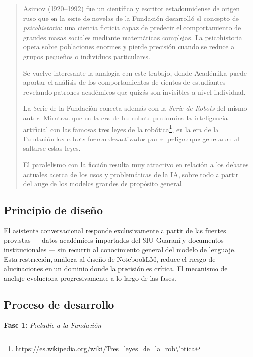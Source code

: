 \documentclass[
  spanish,
]{article}
\begin{document}
\begin{quote}
{\small Asimov (1920--1992) fue un científico y escritor estadounidense de origen ruso
que en la serie de novelas de la Fundación desarrolló el concepto
de \emph{psicohistoria}: una ciencia ficticia capaz de predecir el comportamiento de grandes
masas sociales mediante matemáticas complejas. La psicohistoria opera sobre poblaciones
enormes y pierde precisión cuando se reduce a grupos pequeños o individuos particulares.

Se vuelve interesante la analogía con este trabajo, donde
Académika puede aportar el análisis de los comportamientos
de cientos de estudiantes revelando patrones académicos
que quizás son invisibles a nivel individual.

La Serie de la Fundación conecta además con la \emph{Serie de Robots} del
mismo autor. Mientras que en la era de los robots predomina la inteligencia artificial
con las famosas tres leyes de la robótica\footnote{\url{https://es.wikipedia.org/wiki/Tres_leyes_de_la_rob\'otica}},
en la era de la Fundación los robots fueron desactivados por el peligro que
generaron al saltarse estas leyes.

El paralelismo con la ficción resulta muy atractivo en relación a los debates actuales
acerca de los usos y problemáticas de la IA, sobre todo a partir del auge de los modelos
grandes de propósito general.}
\end{quote}

\subsection{Principio de diseño}\label{principio-de-diseno-anclaje}

El asistente conversacional responde exclusivamente a partir de las fuentes provistas ---
datos académicos importados del SIU Guaraní y documentos institucionales ---
sin recurrir al conocimiento general del modelo de lenguaje.
Esta restricción, análoga al diseño de NotebookLM,
reduce el riesgo de alucinaciones en un dominio donde la precisión es crítica.
El mecanismo de anclaje evoluciona progresivamente a lo largo de las fases.

\subsection{Proceso de desarrollo}\label{proceso-de-desarrollo}

\textbf{Fase 1:} \emph{Preludio a la Fundación}
\end{document}

